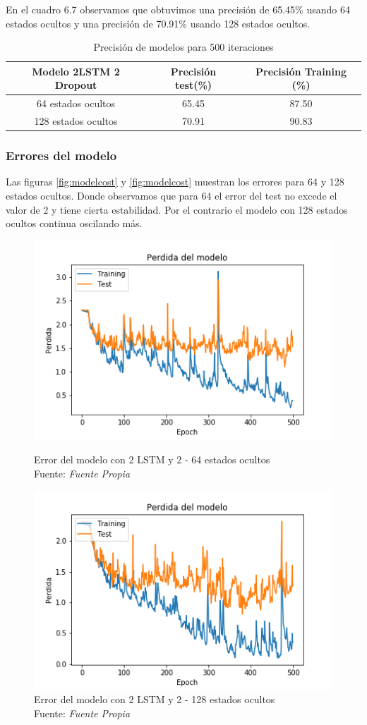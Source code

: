 En el cuadro 6.7 observamos que obtuvimos una precisión de 65.45\% usando 64 estados ocultos y una precisión de 70.91\% usando 128 estados ocultos.
\begin{table}[H]
	\centering
	\begin{tabular}{|c|c|c|}
		\hline
		\rowcolor{Gray}  Modelo 2LSTM 2 Dropout & Precisión test(\%) & Precisión Training (\%)\\ \hline
		64 estados ocultos&     65.45    &                87.50  \\ \hline
		128 estados ocultos&	70.91		&					90.83	\\ \hline
	\end{tabular}
	\caption{Precisión de modelos para 500 iteraciones }
\end{table}

\subsubsection{Errores del modelo}
Las figuras \ref{fig:modelcost}  y \ref{fig:modelcost} muestran los errores para 64 y 128 estados ocultos. Donde observamos que para 64 el error del test no excede el valor de 2 y tiene cierta estabilidad. Por el contrario el modelo con 128 estados ocultos continua oscilando más.
\begin{figure}
	\centering
	\includegraphics[width=0.7\linewidth]{Figures/MODEL_cost}
	\caption{Error del modelo con 2 LSTM y 2 - 64 estados ocultos\\ Fuente: {\textit{Fuente Propia}}}
	\label{fig:modelcost}

	\centering
	\includegraphics[width=0.7\linewidth]{Figures/cost500}
	\caption{Error del modelo con 2 LSTM y 2 - 128 estados ocultos\\ Fuente: {\textit{Fuente Propia}}}
	\label{fig:cost500}
\end{figure}
\newpage

